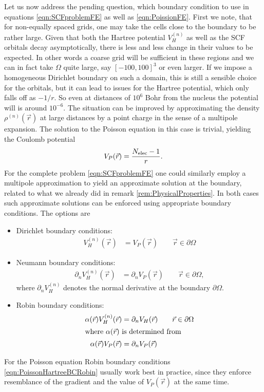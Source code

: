 Let us now address the pending question,
which boundary condition to use in equations
\eqref{eqn:SCFproblemFE} as well as \eqref{eqn:PoissionFE}.
First we note, that for non-equally spaced grids,
one may take the cells close to the boundary to be rather large.
Given that both the Hartree potential $V_H^{(n)}$ as well as the
SCF orbitals decay asymptotically,
there is less and less change in their values to be expected.
In other words a coarse grid will be sufficient in these regions
and we can in fact take $\Omega$ quite large,
say $[-100,100]^3$ or even larger.
If we impose a homogeneous Dirichlet boundary on such a domain,
this is still a sensible choice for the \SCF orbitals,
but it can lead to issues for the Hartree potential, which only falls off as $-1/r$.
So even at distances of $10^6$ Bohr from the nucleus the potential
will is around $10^{-6}$.
The situation can be improved by approximating the density $\rho^{(n)}(\vec{r})$
at large distances by a point charge in the sense of a multipole expansion.
The solution to the Poisson equation in this case is trivial,
yielding the Coulomb potential
\[ V_P(\vec{r}) = \frac{N_\text{elec} -1}{r}. \]
For the complete \SCF problem \eqref{eqn:SCFproblemFE}
one could similarly employ a multipole approximation
to yield an approximate solution at the boundary,
related to what we already did in remark
\vref{rem:PhysicalProperties}.
In both cases such approximate solutions can be enforced
using appropriate boundary conditions.
The options are
\begin{itemize}
	\item Dirichlet boundary conditions:
		\begin{align}
			V_H^{(n)}(\vec{r}) &= V_P(\vec{r}) \qquad \vec{r} \in \partial\Omega
			\label{eqn:PoissonHartreeBCDirichlet}
		\end{align}
	\item Neumann boundary conditions:
		\begin{align}
			\partial_n V_H^{(n)}(\vec{r}) &= \partial_n V_P(\vec{r}) \qquad \vec{r} \in \partial\Omega,
			\label{eqn:PoissonHartreeBCNeumann}
		\end{align}
		where $\partial_n V_H^{(n)}$ denotes the normal derivative at the boundary $\partial\Omega$.
	\item Robin boundary conditions:
		\begin{align}
			\label{eqn:PoissonHartreeBCRobin}
			\alpha(\vec{r}) V_H^{(n)}(\vec{r})
				&= \partial_n V_H(\vec{r}) \qquad \vec{r} \in \partial\Omega \\
		\intertext{where $\alpha(\vec{r})$ is determined from}
			\nonumber
			\alpha(\vec{r}) V_P(\vec{r}) &= \partial_n  V_P(\vec{r}) 
		\end{align}
\end{itemize}
For the Poisson equation Robin boundary conditions
\eqref{eqn:PoissonHartreeBCRobin} usually work best in practice,
since they enforce resemblance of the gradient and the value
of $V_P(\vec{r})$ at the same time.

